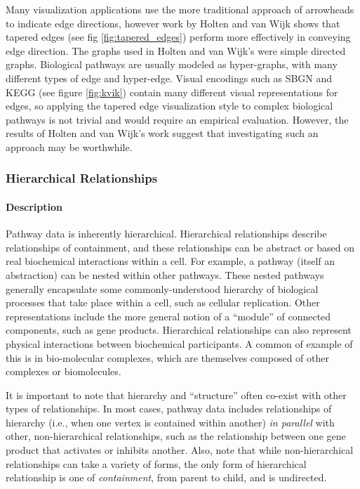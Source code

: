 Many visualization applications use the more traditional approach of arrowheads to indicate edge directions, however work by Holten and van Wijk \cite{Holten2009} shows that tapered edges (see fig \ref{fig:tapered_edges}) perform more effectively in conveying edge direction. The graphs used in Holten and van Wijk's were simple directed graphs. Biological pathways are usually modeled as hyper-graphs, with many different types of edge and hyper-edge. Visual encodings such as SBGN and KEGG (see figure \ref{fig:kvik}) contain many different visual representations for edges, so applying the tapered edge visualization style to complex biological pathways is not trivial and would require an empirical evaluation. However, the results of Holten and van Wijk's work suggest that investigating such an approach may be worthwhile.

\subsubsection*{Hierarchical Relationships}

\paragraph*{Description}

Pathway data is inherently hierarchical.
Hierarchical relationships describe relationships of containment, and these relationships can be abstract or based on real biochemical interactions within a cell.
For example, a pathway (itself an abstraction) can be nested within other pathways.
These nested pathways generally encapsulate some commonly-understood hierarchy of biological processes that take place within a cell, such as cellular replication.
Other representations include the more general notion of a ``module'' of connected components, such as gene products.
Hierarchical relationships can also represent physical interactions between biochemical participants.
A common of example of this is in bio-molecular complexes, which are themselves composed of other complexes or biomolecules.

It is important to note that hierarchy and ``structure'' often co-exist with other types of relationships. In most cases, pathway data includes relationships of hierarchy (i.e., when one vertex is contained within another) \textit{in parallel} with other, non-hierarchical relationships, such as the relationship between one gene product that activates or inhibits another. Also, note that while non-hierarchical relationships can take a variety of forms, the only form of hierarchical relationship is one of \textit{containment}, from parent to child, and is undirected.

